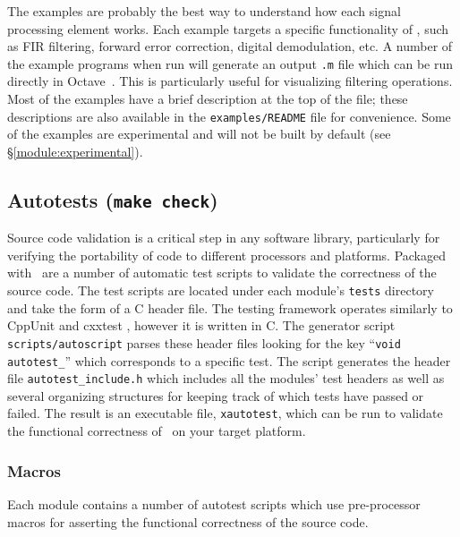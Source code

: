 The examples are probably the best way to understand how each signal
processing element works.
Each example targets a specific functionality of \liquid,
such as FIR filtering, forward error correction, digital demodulation,
etc.
A number of the example programs when run will generate an output
{\tt .m} file which can be run directly in Octave~\cite{octave:web}.
This is particularly useful for visualizing filtering operations.
Most of the examples have a brief description at the top of the file;
these descriptions are also available in the {\tt examples/README} file
for convenience.
Some of the examples are experimental and will not be built by default
(see \S\ref{module:experimental}).

\subsection{Autotests ({\tt make check})}
\label{section:installation:targets:autotests}
Source code validation is a critical step in any software library,
particularly for verifying the portability of code to different processors and
platforms.
Packaged with \liquid\ are a number of automatic test scripts to validate the
correctness of the source code.
The test scripts are located under each module's {\tt tests} directory and
take the form of a C header file.
The testing framework operates similarly to CppUnit \cite{cppunit:web} and
cxxtest \cite{cxxtest:web}, however it is written in C.
The generator script {\tt scripts/autoscript} parses these header files looking for
the key ``{\tt void autotest\_}'' which corresponds to a specific test.
The script generates the header file {\tt autotest\_include.h} which
includes all the modules' test headers as well as several organizing
structures for keeping track of which tests have passed or failed.
The result is an executable file, {\tt xautotest}, which can be run to
validate the functional correctness of \liquid\ on your target platform.

\subsubsection{Macros}
Each module contains a number of autotest scripts which use pre-processor
macros for asserting the functional correctness of the source code.

